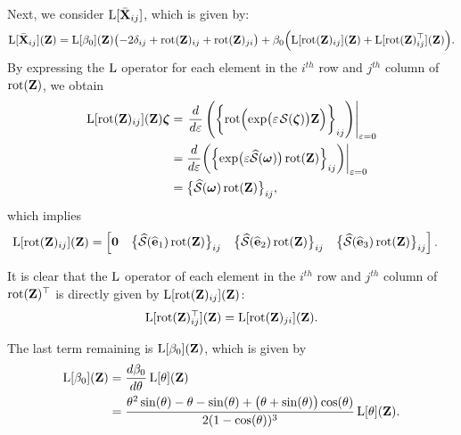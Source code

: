 Next, we consider $\operatorname{L}[\bar{\mathbf{X}}_{ij}]$, which is given by:
\begin{align}
    \operatorname{L}[\bar{\mathbf{X}}_{ij}](\mathbf{Z})= \operatorname{L}[\beta_0](\mathbf{Z})\bigl(-2\delta_{ij}+ \operatorname{rot}(\mathbf{Z})_{ij} + \operatorname{rot}(\mathbf{Z})_{ji}\bigr) + \beta_0\Bigl(\operatorname{L}[\operatorname{rot}(\mathbf{Z})_{ij}](\mathbf{Z}) + \operatorname{L}[\operatorname{rot}(\mathbf{Z})_{ij}^\top](\mathbf{Z})\Bigr).
\end{align}
By expressing the $\operatorname{L}$ operator for each element in the $i^{th}$ row and $j^{th}$ column of $\operatorname{rot}(\mathbf{Z})$, we obtain
\begin{align}
    \Lop[\rot(\mathbf{Z})_{ij}](\mathbf{Z})\boldsymbol{\zeta} &=  \left.\frac{d}{d\varepsilon}\left(\biggl\{\rot\Bigl(\exp\bigl(\varepsilon\SL[\boldsymbol{\zeta}]\bigr)\mathbf{Z}\Bigr)\biggr\}_{ij}\right)\right|_{\varepsilon=0}\\
    &=  \frac{d}{d\varepsilon}\biggl(\Bigl\{\exp\bigl(\varepsilon\widehat{\mathcal{S}}(\boldsymbol{\omega})\bigr)\rot(\mathbf{Z})\Bigr\}_{ij}\biggr)\biggr|_{\varepsilon=0}\\
    &=\bigl\{\widehat{\mathcal{S}}(\boldsymbol{\omega})\rot(\mathbf{Z})\bigr\}_{ij},
\end{align}
which implies
\begin{align}
    \operatorname{L}[\operatorname{rot}(\mathbf{Z})_{ij}](\mathbf{Z}) &= \begin{bmatrix}
        \mathbf{0} & \bigl\{\widehat{\mathcal{S}}(\widehat{\mathbf{e}}_1)\operatorname{rot}(\mathbf{Z})\bigr\}_{ij} & \bigl\{\widehat{\mathcal{S}}(\widehat{\mathbf{e}}_2)\operatorname{rot}(\mathbf{Z})\bigr\}_{ij} & \bigl\{\widehat{\mathcal{S}}(\widehat{\mathbf{e}}_3)\operatorname{rot}(\mathbf{Z})\bigr\}_{ij}
    \end{bmatrix}.
\end{align}

It is clear that the $\operatorname{L}$ operator of each element in the $i^{th}$ row and $j^{th}$ column of $\operatorname{rot}(\mathbf{Z})^\top$ is directly given by $\operatorname{L}[\operatorname{rot}(\mathbf{Z})_{ij}](\mathbf{Z})$:
\begin{align}
    \operatorname{L}[\operatorname{rot}(\mathbf{Z})^\top_{ij}](\mathbf{Z}) = \operatorname{L}[\operatorname{rot}(\mathbf{Z})_{ji}](\mathbf{Z}).
\end{align}

The last term remaining is $\operatorname{L}[\beta_0](\mathbf{Z})$, which is given by
\begin{align}
    \operatorname{L}[\beta_0](\mathbf{Z}) &= \frac{d\beta_0}{d\theta} \operatorname{L}[\theta](\mathbf{Z})\\
    &= \frac{\theta^2\sin(\theta) - \theta - \sin(\theta) + \bigl(\theta + \sin(\theta)\bigr) \cos(\theta)}{2 (1 - \cos(\theta))^3} \operatorname{L}[\theta](\mathbf{Z}).
\end{align}

